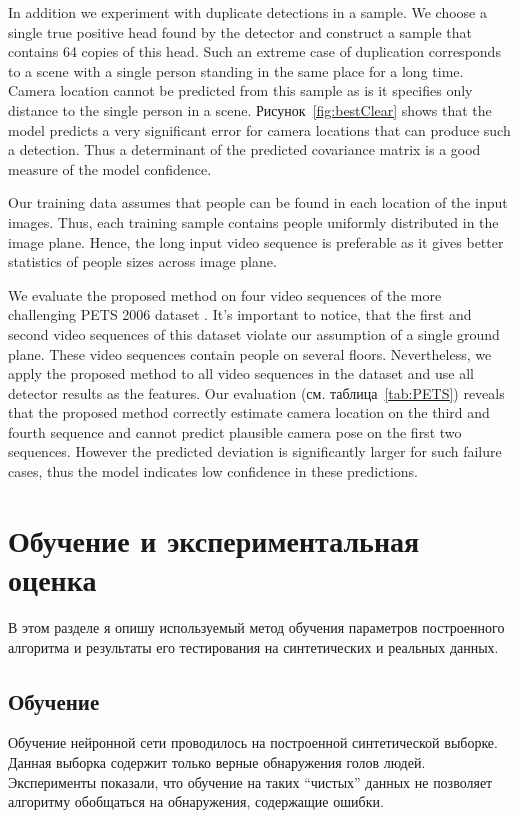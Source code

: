 In addition we experiment with duplicate detections in a sample. We choose a single true positive head found by the detector and construct a sample that contains 64 copies of this head. Such an extreme case of duplication corresponds to a scene with a single person standing in the same place for a long time. Camera location cannot be predicted from this sample as is it specifies only distance to the single person in a scene. Рисунок~\ref{fig:bestClear} shows that the model predicts a very significant error for camera locations that can produce such a detection. Thus a determinant of the predicted covariance matrix is a good measure of the model confidence.

Our training data assumes that people can be found in each location of the input images. Thus, each training sample contains people uniformly distributed in the image plane. Hence, the long input video sequence is preferable as it gives better statistics of people sizes across image plane.

We evaluate the proposed method on four video sequences of the more challenging PETS 2006 dataset \cite{thirde2006overview}. It's important to notice, that the first and second video sequences of this dataset violate our assumption of a single ground plane. These video sequences contain people on several floors. Nevertheless, we apply the proposed method to all video sequences in the dataset and use all detector results as the features. Our evaluation (см. таблица~\ref{tab:PETS}) reveals that the proposed method correctly estimate camera location on the third and fourth sequence and cannot predict plausible camera pose on the first two sequences. However the predicted deviation is significantly larger for such failure cases, thus the model indicates low confidence in these predictions.

\section{Обучение и экспериментальная оценка}

В этом разделе я опишу используемый метод обучения параметров построенного алгоритма и результаты его тестирования на синтетических и реальных данных.

\subsection{Обучение}

Обучение нейронной сети проводилось на построенной синтетической выборке. Данная выборка содержит только верные обнаружения голов людей. Эксперименты показали, что обучение на таких ``чистых'' данных не позволяет алгоритму обобщаться на обнаружения, содержащие ошибки.


